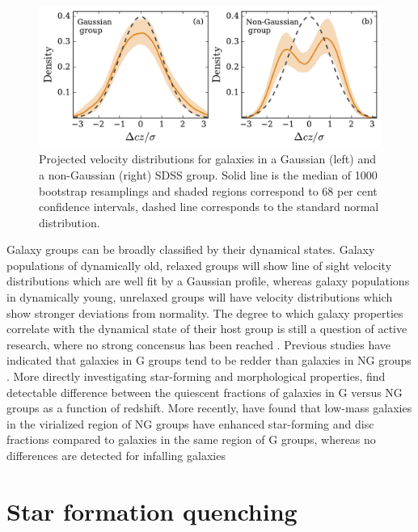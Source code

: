 \begin{figure}[!ht]
  \centering
  \includegraphics[width=\textwidth]{vdist.pdf}
  \caption{Projected velocity distributions for galaxies in a
    Gaussian (left) and a non-Gaussian (right) SDSS group.  Solid line
    is the median of 1000
  bootstrap resamplings and shaded regions correspond to 68 per cent
  confidence intervals, dashed line corresponds to the standard normal
  distribution.}
  \label{fig:vdist}
\end{figure}

Galaxy groups can be broadly classified by their dynamical states.
Galaxy populations of dynamically old, relaxed groups will show
line of sight velocity distributions which are well fit by a Gaussian
profile, whereas galaxy populations in dynamically young, unrelaxed
groups will have velocity distributions which show stronger deviations
from normality.  The degree to which galaxy properties correlate with
the dynamical state of their host group is still a question of active
research, where no strong concensus has been reached
\citep[e.g.][]{biviano2002, ribeiro2013b}.  Previous studies have
indicated that galaxies in G groups tend to be redder than galaxies in
NG groups \citep{ribeiro2010, carollo2013, ribeiro2013a}.  More
directly investigating star-forming and morphological properties,
\citet{hou2013} find detectable difference between the quiescent
fractions of galaxies in G versus NG groups as a function of
redshift.  More recently, \citet{roberts2016b} have found that
low-mass galaxies in the virialized region of NG groups have enhanced
star-forming and disc fractions compared to galaxies in the same
region of G groups, whereas no differences are detected for infalling
galaxies 

\section{Star formation quenching}
\label{sec:sfr_quench}

